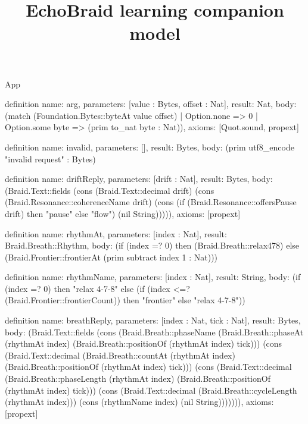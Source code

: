 \begin{lexlean}{App}
\title{EchoBraid learning companion model}
\begin{semanticmodule}
definition{
  name: arg,
  parameters: [value : Bytes, offset : Nat],
  result: Nat,
  body: (match (Foundation.Bytes::byteAt value offset)
    | Option.none => 0
    | Option.some byte => (prim to_nat byte : Nat)),
  axioms: [Quot.sound, propext]
}

definition{
  name: invalid,
  parameters: [],
  result: Bytes,
  body: (prim utf8_encode "invalid request" : Bytes)
}

definition{
  name: driftReply,
  parameters: [drift : Nat],
  result: Bytes,
  body: (Braid.Text::fields (cons (Braid.Text::decimal drift) (cons (Braid.Resonance::coherenceName drift) (cons (if (Braid.Resonance::offersPause drift) then "pause" else "flow") (nil String))))),
  axioms: [propext]
}

definition{
  name: rhythmAt,
  parameters: [index : Nat],
  result: Braid.Breath::Rhythm,
  body: (if (index =? 0) then (Braid.Breath::relax478) else (Braid.Frontier::frontierAt (prim subtract index 1 : Nat)))
}

definition{
  name: rhythmName,
  parameters: [index : Nat],
  result: String,
  body: (if (index =? 0) then "relax 4-7-8" else (if (index <=? (Braid.Frontier::frontierCount)) then "frontier" else "relax 4-7-8"))
}

definition{
  name: breathReply,
  parameters: [index : Nat, tick : Nat],
  result: Bytes,
  body: (Braid.Text::fields (cons (Braid.Breath::phaseName (Braid.Breath::phaseAt (rhythmAt index) (Braid.Breath::positionOf (rhythmAt index) tick))) (cons (Braid.Text::decimal (Braid.Breath::countAt (rhythmAt index) (Braid.Breath::positionOf (rhythmAt index) tick))) (cons (Braid.Text::decimal (Braid.Breath::phaseLength (rhythmAt index) (Braid.Breath::positionOf (rhythmAt index) tick))) (cons (Braid.Text::decimal (Braid.Breath::cycleLength (rhythmAt index))) (cons (rhythmName index) (nil String))))))),
  axioms: [propext]
}


\end{semanticmodule}
\end{lexlean}
